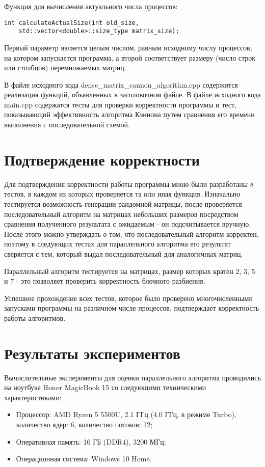 \documentclass{report}
\begin{document}
\par Функция для вычисления актуального числа процессов:
\begin{lstlisting}
int calculateActualSize(int old_size,
    std::vector<double>::size_type matrix_size);
\end{lstlisting}
Первый параметр является целым числом, равным исходному числу процессов, на котором запускается программа, а второй соответствует размеру (число строк или столбцов) перемножаемых матриц.
\par В файле исходного кода dense\_matrix\_cannon\_algorithm.cpp содержится реализация функций, объявленных в заголовочном файле. В файле исходного кода main.cpp содержатся тесты для проверки корректности программы и тест, показывающий эффективность алгоритма Кэннона путем сравнения его времени выполнения с последовательной схемой.
\newpage

\section*{Подтверждение корректности}
Для подтверждения корректности работы программы мною были разработаны 8 тестов, в каждом из которых проверяется та или иная функция. Изначально тестируется возможность генерации рандомной матрицы, после проверяется последовательный алгоритм на матрицах небольших размеров посредством сравнения полученного результата с ожидаемым - он подсчитывается вручную. После этого можно утверждать о том, что последовательный алгоритм корректен, поэтому в следующих тестах для параллельного алгоритма его результат сверяется с тем, который выдал последовательный для аналогичных матриц.
\par Параллельный алгоритм тестируется на матрицах, размер которых кратен 2, 3, 5 и 7 - это позволяет проверить корректность блочного разбиения.
\par Успешное прохождение всех тестов, которое было проверено многочисленными запусками программы на различном числе процессов, подтверждает корректность работы алгоритмов.
\newpage

\section*{Результаты экспериментов}
Вычислительные эксперименты для оценки параллельного алгоритма проводились на ноутбуке Honor MagicBook 15 со следующими техническими характеристиками:
\begin{itemize}
\item Процессор: AMD Ryzen 5 5500U, 2.1 ГГц (4.0 ГГц, в режиме Turbo), количество ядер: 6, количество потоков: 12;
\item Оперативная память: 16 ГБ (DDR4), 3200 МГц;
\item Операционная система: Windows 10 Home.
\end{itemize}
\end{document}
